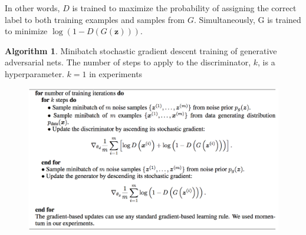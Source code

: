 \documentclass{article} %
\theoremstyle{definition}
\newtheorem{algorithm}{Algorithm}
\begin{document}
In other words, $D$ is trained to maximize the probability of assigning the correct label to both training examples and samples from $G$. Simultaneously, G is trained to minimize $\log(1-D(G(\textbf{z})))$.

\begin{algorithm}
Minibatch stochastic gradient descent training of generative adversarial nets. The number of steps to apply to the discriminator, $k$, is a hyperparameter. $k=1$ in experiments
\begin{figure}[H]
	\centering
	\includegraphics[width=0.9\linewidth]{2}
	\label{fig:algo}
\end{figure}
\end{algorithm}
\end{document}
